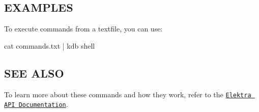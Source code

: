 \subsection*{E\+X\+A\+M\+P\+L\+E\+S}

To execute commands from a textfile, you can use\+: \begin{DoxyVerb}    cat commands.txt | kdb shell
\end{DoxyVerb}


\subsection*{S\+E\+E A\+L\+S\+O}

To learn more about these commands and how they work, refer to the \href{http://doc.libelektra.org/api/current/html}{\tt Elektra A\+P\+I Documentation}. 